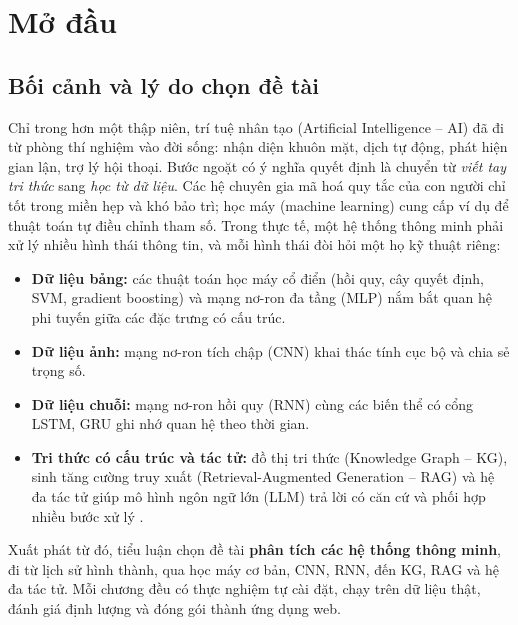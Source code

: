 \chapter*{Mở đầu}

\section*{Bối cảnh và lý do chọn đề tài}
Chỉ trong hơn một thập niên, trí tuệ nhân tạo (Artificial Intelligence -- AI) đã đi từ phòng thí nghiệm vào đời sống: nhận
diện khuôn mặt, dịch tự động, phát hiện gian lận, trợ lý hội thoại. Bước ngoặt có ý nghĩa quyết định là chuyển từ \emph{viết tay
tri thức} sang \emph{học từ dữ liệu}. Các hệ chuyên gia mã hoá quy tắc của con người chỉ tốt trong miền hẹp và khó bảo trì; học
máy (machine learning) cung cấp ví dụ để thuật toán tự điều chỉnh tham số. Trong thực tế, một hệ thống thông minh phải xử lý nhiều
hình thái thông tin, và mỗi hình thái đòi hỏi một họ kỹ thuật riêng:

\begin{itemize}
  \item \textbf{Dữ liệu bảng:} các thuật toán học máy cổ điển (hồi quy, cây quyết định, SVM, gradient boosting) và mạng nơ-ron
        đa tầng (MLP) nắm bắt quan hệ phi tuyến giữa các đặc trưng có cấu trúc.
  \item \textbf{Dữ liệu ảnh:} mạng nơ-ron tích chập (CNN) khai thác tính cục bộ và chia sẻ trọng số.
  \item \textbf{Dữ liệu chuỗi:} mạng nơ-ron hồi quy (RNN) cùng các biến thể có cổng LSTM, GRU ghi nhớ quan hệ theo thời gian.
  \item \textbf{Tri thức có cấu trúc và tác tử:} đồ thị tri thức (Knowledge Graph -- KG), sinh tăng cường truy xuất
        (Retrieval-Augmented Generation -- RAG) \cite{ch1:lewis2020} và hệ đa tác tử giúp mô hình ngôn ngữ lớn (LLM) trả lời có
        căn cứ và phối hợp nhiều bước xử lý \cite{ch1:yao2023}.
\end{itemize}

Xuất phát từ đó, tiểu luận chọn đề tài \textbf{phân tích các hệ thống thông minh}, đi từ lịch sử hình thành, qua học máy cơ bản,
CNN, RNN, đến KG, RAG và hệ đa tác tử. Mỗi chương đều có thực nghiệm tự cài đặt, chạy trên dữ liệu thật, đánh giá định lượng và
đóng gói thành ứng dụng web.

